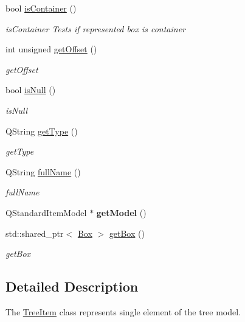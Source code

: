 \begin{DoxyCompactItemize}
bool \hyperlink{class_tree_item_ae047d6d6ac037ed5928d1c099f5ea097}{is\-Container} ()
\begin{DoxyCompactList}\small\item\em is\-Container Tests if represented box is container \end{DoxyCompactList}\item 
int unsigned \hyperlink{class_tree_item_ad025779f60a443c0de1f534aafd41b7b}{get\-Offset} ()
\begin{DoxyCompactList}\small\item\em get\-Offset \end{DoxyCompactList}\item 
bool \hyperlink{class_tree_item_ac7f44a467b5466392cf3330af53afc52}{is\-Null} ()
\begin{DoxyCompactList}\small\item\em is\-Null \end{DoxyCompactList}\item 
Q\-String \hyperlink{class_tree_item_abeb2418adb8d739c6f85ca95243aba88}{get\-Type} ()
\begin{DoxyCompactList}\small\item\em get\-Type \end{DoxyCompactList}\item 
Q\-String \hyperlink{class_tree_item_a5faf2bd42074e0e1dba3126a2cbc0e5a}{full\-Name} ()
\begin{DoxyCompactList}\small\item\em full\-Name \end{DoxyCompactList}\item 
\hypertarget{class_tree_item_a588098933468fd801e8fa11e57053608}{Q\-Standard\-Item\-Model $\ast$ {\bfseries get\-Model} ()}\label{class_tree_item_a588098933468fd801e8fa11e57053608}

\item 
std\-::shared\-\_\-ptr$<$ \hyperlink{class_box}{Box} $>$ \hyperlink{class_tree_item_a3533a32e58f68761a87de666ec2e37bf}{get\-Box} ()
\begin{DoxyCompactList}\small\item\em get\-Box \end{DoxyCompactList}\end{DoxyCompactItemize}


\subsection{Detailed Description}
The \hyperlink{class_tree_item}{Tree\-Item} class represents single element of the tree model. 

